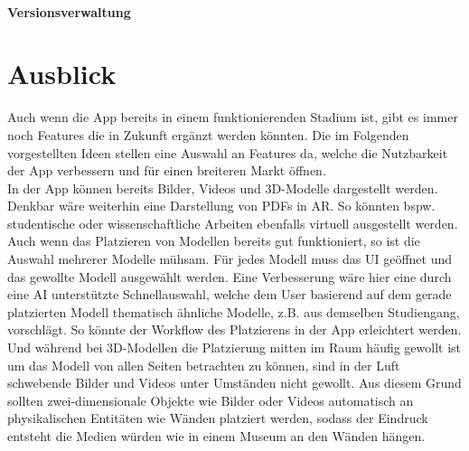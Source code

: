 \documentclass[titlepage, a4paper, 11pt]{scrartcl}
\begin{document}
  \paragraph{Versionsverwaltung}

  
  \section{Ausblick}
  Auch wenn die App bereits in einem funktionierenden Stadium ist, gibt es immer noch Features die in Zukunft ergänzt werden könnten. Die im Folgenden vorgestellten Ideen stellen eine Auswahl an Features da, welche die Nutzbarkeit der App verbessern und für einen breiteren Markt öffnen.\\
  In der App können bereits Bilder, Videos und 3D-Modelle dargestellt werden. Denkbar wäre weiterhin eine Darstellung von PDFs in AR. So könnten bspw. studentische oder wissenschaftliche Arbeiten ebenfalls virtuell ausgestellt werden.\\
  Auch wenn das Platzieren von Modellen bereits gut funktioniert, so ist die Auswahl mehrerer Modelle mühsam. Für jedes Modell muss das UI geöffnet und das gewollte Modell ausgewählt werden. Eine Verbesserung wäre hier eine durch eine AI unterstützte Schnellauswahl, welche dem User basierend auf dem gerade platzierten Modell thematisch ähnliche Modelle, z.B. aus demselben Studiengang, vorschlägt. So könnte der Workflow des Platzierens in der App erleichtert werden.\\
  Und während bei 3D-Modellen die Platzierung mitten im Raum häufig gewollt ist um das Modell von allen Seiten betrachten zu können, sind in der Luft schwebende Bilder und Videos unter Umständen nicht gewollt. Aus diesem Grund sollten zwei-dimensionale Objekte wie Bilder oder Videos automatisch an physikalischen Entitäten wie Wänden platziert werden, sodass der Eindruck entsteht die Medien würden wie in einem Museum an den Wänden hängen.\\
\end{document}
